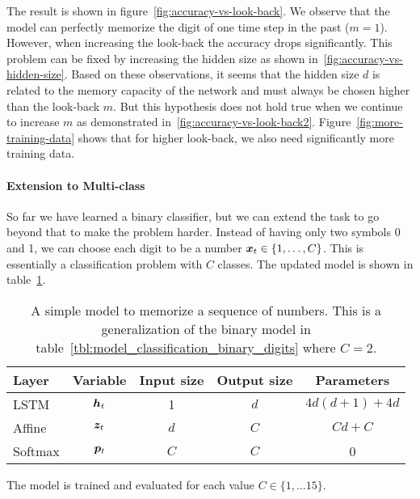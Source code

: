 		The result is shown in figure~\ref{fig:accuracy-vs-look-back}. 
		We observe that the model can perfectly memorize the digit of one time step in the past ($m = 1$).
		However, when increasing the look-back the accuracy drops significantly.
		This problem can be fixed by increasing the hidden size as shown in~\ref{fig:accuracy-vs-hidden-size}.
		Based on these observations, it seems that the hidden size $d$ is related to the memory capacity of the network and must always be chosen higher than the look-back $m$. 
		But this hypothesis does not hold true when we continue to increase $m$ as demonstrated in~\ref{fig:accuracy-vs-look-back2}.
		Figure~\ref{fig:more-training-data} shows that for higher look-back, we also need significantly more training data. 
		
		\paragraph{Extension to Multi-class}
		So far we have learned a binary classifier, but we can extend the task to go beyond that to make the problem harder.
		Instead of having only two symbols 0 and 1, we can choose each digit to be a number $\bm{x}_t \in \{1, \dots, C\}$.
		This is essentially a classification problem with $C$ classes.
		The updated model is shown in table~\ref{tbl:model_classification_multi_class_digits}.
		\begin{table}[tb]
			\small
			\begin{center}
				\begin{tabular}{|l|c|c|c|c|}
					\hline
					Layer 	& Variable 			& Input size 	& Output size 	& Parameters 			\\ \hline
					LSTM 	& $\bm{h}_t$		& 1 			& $d$ 			& $4d(d + 1) + 4d$ 		\\ \hline
					Affine 	& $\bm{z}_t$		& $d$ 			& $C$ 			& $Cd + C$ 				\\ \hline
					Softmax & $\bm{p}_t$		& $C$ 			& $C$ 			& 0						\\ \hline
				\end{tabular}
			\end{center}
			\caption[A simple model to memorize a sequence of numbers]
					{A simple model to memorize a sequence of numbers.
				 This is a generalization of the binary model in table~\ref{tbl:model_classification_binary_digits} where $C = 2$.}
			\label{tbl:model_classification_multi_class_digits}
		\end{table}
		The model is trained and evaluated for each value $C \in \{1, \dots 15\}$.
